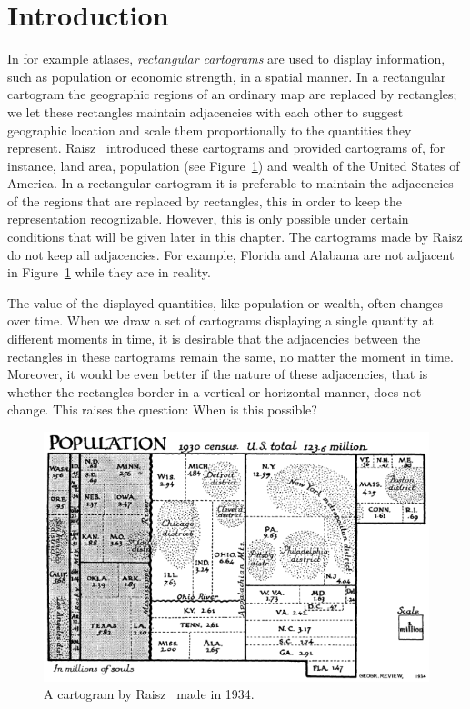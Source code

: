 
\section{Introduction}
\thispagestyle{plain}


  In for example atlases, \emph{rectangular cartograms} are used to display information, such as population or economic strength, in a spatial manner.
  In a rectangular cartogram  the geographic regions of an ordinary map are replaced by rectangles; we let these rectangles maintain adjacencies with each other to suggest geographic location and scale them proportionally to the quantities they represent.
  Raisz~\cite{Raisz1934} introduced these cartograms and provided cartograms of, for instance, land area, population (see Figure~\ref{fig:intro:raisz}) and wealth of the United States of America.
  In a rectangular cartogram it is preferable to maintain the adjacencies of the regions that are replaced by rectangles, this in order to keep the representation recognizable.
  However, this is only possible under certain conditions that will be given later in this chapter.
  The cartograms made by Raisz do not keep all adjacencies. For example, Florida and Alabama are not adjacent in Figure~\ref{fig:intro:raisz} while they are in reality.

  The value of the displayed quantities, like population or wealth, often changes over time.
  When we draw a set of cartograms displaying a single quantity at different moments in time, it is desirable that the adjacencies between the rectangles in these cartograms remain the same, no matter the moment in time.
  Moreover, it would be even better if the nature of these adjacencies, that is whether the rectangles border in a vertical or horizontal manner, does not change.
  This raises the question: When is this possible?

  \begin{figure}[!b]
    \centering
    \includegraphics[scale=.8]{introduction/img/cartogram.png}
    \caption{A cartogram by Raisz~\cite{Raisz1934} made in 1934.}
    \label{fig:intro:raisz}
  \end{figure}

